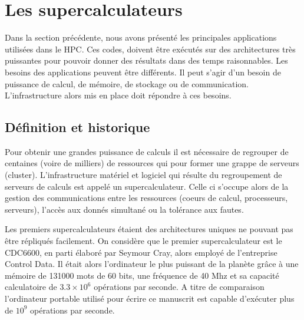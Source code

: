
\section{Les supercalculateurs}\label{sec:supercomputer}
 
Dans la section précédente, nous avons présenté les principales applications utilisées dans le HPC. Ces codes, doivent être exécutés sur des architectures très puissantes pour pouvoir donner des résultats dans des temps raisonnables. Les besoins des applications peuvent être différents. Il peut s'agir d'un besoin de puissance de calcul, de mémoire, de stockage ou de communication. L'infrastructure alors mis en place doit répondre à ces besoins.  


\subsection{Définition et historique}

    Pour obtenir une grandes puissance de calculs il est nécessaire de regrouper de centaines (voire de milliers) de ressources qui pour former une grappe de serveurs (cluster). L'infrastructure matériel et logiciel qui résulte du regroupement de serveurs de calculs est appelé un supercalculateur. Celle ci s'occupe alors de la gestion des communications entre les ressources (coeurs de calcul, processeurs, serveurs), l'accès aux donnés simultané ou la tolérance aux fautes. 
    
    Les premiers supercalculateurs étaient des architectures uniques ne pouvant pas être répliqués facilement. On considère que le premier supercalculateur est le CDC6600, en parti élaboré par Seymour Cray, alors employé de l'entreprise Control Data. Il était alors l'ordinateur le plus puissant de la planète grâce à une mémoire de 131000 mots de 60 bits, une fréquence de 40 Mhz et sa capacité calculatoire de $3.3 \times 10^6$ opérations par seconde. A titre de comparaison l'ordinateur portable utilisé pour écrire ce manuscrit est capable d'exécuter plus de $10^9$ opérations par seconde. 
        
